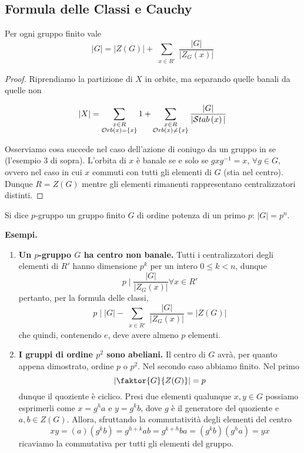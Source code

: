 \subsection{Formula delle Classi e Cauchy}
\begin{multicols}{2}

\begin{theorem}
	Per ogni gruppo finito vale
	\[ |G| = |Z(G)| + \sum_{\substack{x \in R'}} \frac{|G|}{|Z_G(x)|} \]
\end{theorem}
\begin{proof}
	Riprendiamo la partizione di $ X $ in orbite, ma separando quelle banali da quelle non
	
	\[ |X| = \sum_{\substack{x \in R \\ \mathcal{O}rb\left( x \right) = \{x\} }} 1 + \sum_{\substack{x \in R \\ \mathcal{O}rb\left( x \right) \neq \{x\} }} \frac{|G|}{|\mathcal{S}tab\left( x \right)|} \]
	
	Osserviamo cosa succede nel caso dell'azione di coniugo da un gruppo in se (l'esempio 3 di sopra). L'orbita di $ x $ è banale se e solo se $ gxg^{-1} = x $, $ \forall g \in G $, ovvero nel caso in cui $ x $ commuti con tutti gli elementi di $ G $ (stia nel centro). Dunque $ R = Z(G) $ mentre gli elementi rimanenti rappresentano centralizzatori distinti.
\end{proof}

\begin{definition}[$ p $-gruppo]
	Si dice $ p $-gruppo un gruppo finito $ G $ di ordine potenza di un primo $ p $: $ |G| = p^n $.
\end{definition}

\textbf{Esempi.}
\begin{enumerate}
	\item \textbf{Un $ p $-gruppo $ G $ ha centro non banale.} Tutti i centralizzatori degli elementi di $ R' $ hanno dimensione $ p^k $ per un intero $ 0 \leq k < n $, dunque
	\[ p \mid \frac{|G|}{|Z_G(x)|} \forall x \in R' \]
	pertanto, per la formula delle classi,
	\[ p \mid |G| - \sum_{\substack{x \in R'}} \frac{|G|}{|Z_G(x)|} = |Z(G)| \]
	che quindi, contenendo $ e $, deve avere almeno $ p $ elementi.
	
	\item \textbf{I gruppi di ordine $ p^2 $ sono abeliani.} Il centro di $ G $ avrà, per quanto appena dimostrato, ordine $ p $ o $ p^2 $. Nel secondo caso abbiamo finito. Nel primo \[  \left|\faktor{G}{Z(G)}\right| = p \] dunque il quoziente è ciclico. Presi due elementi qualunque $ x, y \in G $ possiamo esprimerli come $ x = g^h a $ e $ y = g^k b $, dove $ g $ è il generatore del quoziente e $ a, b \in Z(G) $. Allora, sfruttando la commutatività degli elementi del centro \[ xy = ( a) (g^k b) = g^{h+k} ab = g^{k+h} ba = (g^k b) (g^h a) = yx \]
	ricaviamo la commutativa per tutti gli elementi del gruppo.
	

\end{enumerate}
\end{multicols}
